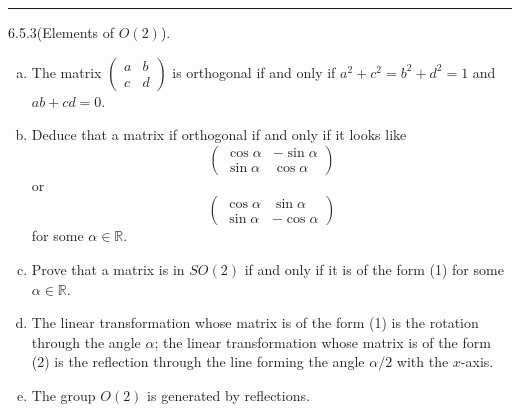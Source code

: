\documentclass[a4paper, 12pt]{article}
\begin{document}
\noindent\rule{7in}{2.8pt}
\begin{problem}{6.5.3(Elements of \(O(2)\)).}
\begin{enumerate}[(a)]
\item The matrix \(\begin{pmatrix}
    a&b\\ 
    c&d
\end{pmatrix}\) is orthogonal if and only if \(a^2+c^2=b^2+d^2=1\) and \(ab+cd=0\).
\item Deduce that a matrix if orthogonal if and only if it looks like 
\begin{equation}
    \begin{pmatrix}
    \cos \alpha&-\sin \alpha\\ 
    \sin \alpha&\cos \alpha
\end{pmatrix}
\end{equation}
or
\begin{equation}
    \begin{pmatrix}
    \cos \alpha&\sin \alpha\\ 
    \sin \alpha&-\cos \alpha
\end{pmatrix}
\end{equation}
for some \(\alpha\in \mathbb{R}\).
\item Prove that a matrix is in \(SO(2)\) if and only if it is of the form (1) for some \(\alpha\in \mathbb{R}\).
\item The linear transformation whose matrix is of the form (1) is the rotation through the angle \(\alpha\); the linear transformation whose matrix is of the form (2) is 
the reflection through the line forming the angle \(\alpha/2\) with the \(x\)-axis.
\item The group \(O(2)\) is generated by reflections. 
\end{enumerate}
\end{problem}
\end{document}
